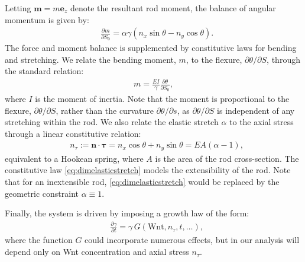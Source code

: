 Letting $\mathbf{m} = m\mathbf{e}_z$ denote the resultant rod moment, the balance of angular momentum is given by:
\begin{align}
&\frac{\partial m}{\partial S_0} = \alpha\gamma(n_x\sin\theta - n_y\cos\theta).\label{eq:dim2Dmoment}
\end{align}
The force and moment balance is supplemented by constitutive laws for bending and stretching. We relate the bending moment, $m$, to the flexure, $\partial\theta/\partial S$, through the standard relation:
\begin{align}
m = \frac{EI}{\gamma}\frac{\partial \theta}{\partial S_0},\label{eq:dimlagrangianbending}
\end{align}
where $I$ is the moment of inertia. Note that the moment is proportional to the flexure, $\partial\theta/\partial S$, rather than the curvature $\partial\theta/\partial s$, as $\partial\theta/\partial S$ is independent of any stretching within the rod. We also relate the elastic stretch $\alpha$ to the axial stress through a linear constitutive relation:
\begin{align}
&n_\tau:=\mathbf{n}\cdot\boldsymbol{\tau}=n_x\cos\theta + n_y\sin\theta = EA(\alpha - 1),\label{eq:dimelasticstretch}
\end{align}
equivalent to a Hookean spring, where $A$ is the area of the rod cross-section. The constitutive law \eqref{eq:dimelasticstretch} models the extensibility of the rod. Note that for an inextensible rod, \eqref{eq:dimelasticstretch} would be replaced by the geometric constraint $\alpha \equiv 1$.

Finally, the system is driven by imposing a growth law of the form:
\begin{align}
&\frac{\partial\gamma}{\partial t}=\gamma \,G(\text{Wnt},n_\tau, t, \dots),\label{eq:growthlawgeneric}
\end{align}
where the function $G$ could incorporate numerous effects, but in our analysis will depend only on Wnt concentration and axial stress $n_\tau$. 

